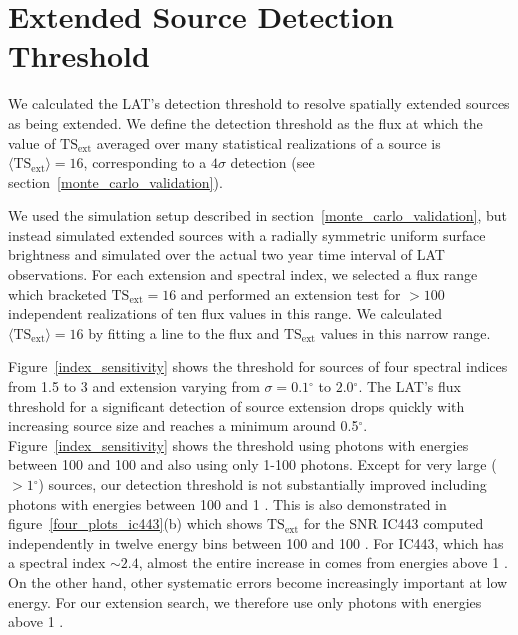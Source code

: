 \documentclass[12pt,preprint]{aastex}
\newcommand{\mev}{\text{MeV}\xspace}
\newcommand{\gev}{\text{GeV}\xspace}
\newcommand{\tsext}{{\ensuremath{\text{TS}_{\text{ext}}}}\xspace}
\newcommand{\ts}{\text{TS}\xspace}
\renewcommand{\deg}{\ensuremath{^\circ}\xspace}
\renewcommand{\approx}{\sim\!\xspace}
\begin{document}
\section{Extended Source Detection Threshold}
\label{extension_sensitivity}

We calculated the LAT's detection threshold to resolve spatially extended
sources as being extended. We define the detection threshold as the flux at which the value
of $\tsext$ averaged over many statistical realizations of a source
is $\langle\tsext\rangle=16$, corresponding to a $4\sigma$ detection
(see section~\ref{monte_carlo_validation}).

We used the simulation setup described in
section~\ref{monte_carlo_validation}, but instead simulated extended
sources with a radially symmetric uniform surface
brightness and
simulated over the actual two year time interval of LAT observations.  
For each extension and
spectral index, we selected a flux range which bracketed $\tsext=16$
and performed an extension test for $>100$ independent realizations of
ten flux values in this range.
We calculated $\langle\tsext\rangle=16$ by fitting a line to the flux
and $\tsext$ values in this narrow range.

Figure~\ref{index_sensitivity} shows the threshold for sources of four
spectral indices from 1.5 to 3 and extension varying from $\sigma=0.1\deg$
to $2.0\deg$.  The LAT's flux threshold for a significant detection
of source extension drops quickly with
increasing source size and reaches a minimum around 0.5\deg. 
Figure~\ref{index_sensitivity} shows
the threshold using photons with energies between 100 \mev and 100 \gev
and also using only 1-100\gev photons.
Except for very large ($>1\deg$) sources, our detection threshold is
not substantially improved including photons with energies between 100 \mev and
1 \gev.  This is also demonstrated in figure~\ref{four_plots_ic443}(b)
which shows \tsext for the SNR IC443 computed independently in twelve
energy bins between 100 \mev and 100 \gev. For IC443, which has a
spectral index $\approx2.4$, almost the entire increase in \ts comes
from energies above 1 \gev.  On the other hand, other systematic errors
become increasingly important at low energy. For our extension search,
we therefore use only photons with energies above 1 \gev.
\end{document}
